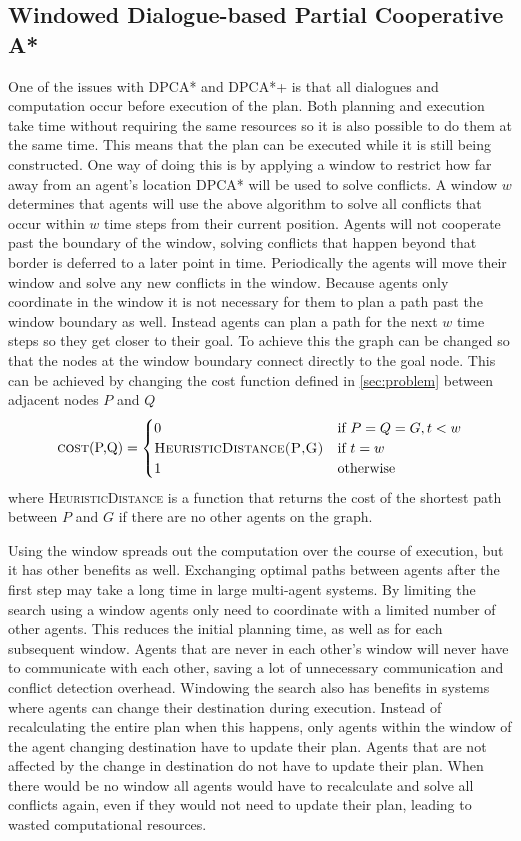 \subsection{Windowed Dialogue-based Partial Cooperative A*}
One of the issues with DPCA* and DPCA*+ is that all dialogues and computation
occur before execution of the plan. Both planning and execution take time
without requiring the same resources so it is also possible to do them at the
same time. This means that the plan can be executed while it is still being
constructed. One way of doing this is by applying a window to restrict how far
away from an agent's location DPCA* will be used to solve conflicts. A
window $w$ determines that agents will use the above algorithm to solve all
conflicts that occur within $w$ time steps from their current position. Agents
will not cooperate past the boundary of the window, solving conflicts that
happen beyond that border is deferred to a later point in time. Periodically
the agents will move their window and solve any new conflicts in the window.
Because agents only coordinate in the window it is not necessary for them to
plan a path past the window boundary as well. Instead agents can plan a path
for the next $w$ time steps so they get closer to their goal. To achieve this
the graph can be changed so that the nodes at the window boundary connect
directly to the goal node. This can be achieved by changing the cost function
defined in \autoref{sec:problem} between adjacent nodes $P$ and $Q$
\cite{silver2005}
\[
\text{\textsc{cost}(P,Q)} =
\begin{cases}
    0 & \text{if } P = Q = G, t < w \\
    \textsc{HeuristicDistance(P,G)} & \text{if } t = w \\
    1 & \text{otherwise}
\end{cases}
\]
where \textsc{HeuristicDistance} is a function that returns the cost of the
shortest path between $P$ and $G$ if there are no other agents on the graph.

Using the window spreads out the computation over the course of execution, but
it has other benefits as well. Exchanging optimal paths between agents after
the first step may take a long time in large multi-agent systems.
By limiting the search using a window agents only need to coordinate with a
limited number of other agents. This reduces
the initial planning time, as well as for each subsequent window. Agents that
are never in each other's window will never have to communicate with each other,
saving a lot of unnecessary communication and conflict detection overhead.
Windowing the search also has benefits in systems where agents can change their
destination during execution. Instead of recalculating the entire plan when
this happens, only agents within the window of the agent changing destination
have to update their plan. Agents that are not affected by the change in
destination do not have to update their plan. When there would be no window all
agents would have to recalculate and solve all conflicts again, even if they
would not need to update their plan, leading to wasted computational resources.

